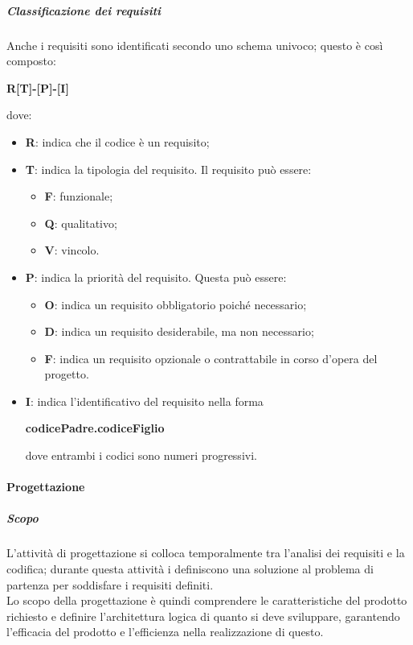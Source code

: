 \documentclass[../norme-di-progetto.tex]{subfiles}
\begin{document}
\subparagraph{Classificazione dei requisiti}
Anche i requisiti sono identificati secondo uno schema univoco; questo è così composto: \\
\begin{center}
  \centering
  \textbf{R[T]-[P]-[I]}
\end{center} dove:
\begin{itemize}
  \item \textbf{R}: indica che il codice è un requisito;
  \item \textbf{T}: indica la tipologia del requisito. Il requisito può essere:
  \begin{itemize}
    \item \textbf{F}: funzionale;
    \item \textbf{Q}: qualitativo;
    \item \textbf{V}: vincolo.
  \end{itemize}
  \item \textbf{P}: indica la priorità del requisito. Questa può essere:
  \begin{itemize}
    \item \textbf{O}: indica un requisito obbligatorio poiché necessario;
    \item \textbf{D}: indica un requisito desiderabile, ma non necessario;
    \item \textbf{F}: indica un requisito opzionale o contrattabile in corso d'opera del progetto.
  \end{itemize}
  \item \textbf{I}: indica l'identificativo del requisito nella forma \\
  \begin{center}
    \centering
    \textbf{codicePadre.codiceFiglio}
  \end{center} dove entrambi i codici sono numeri progressivi.
\end{itemize}


\paragraph{Progettazione}
\subparagraph{Scopo}
L'attività di progettazione si colloca temporalmente tra l'analisi dei requisiti e la codifica; durante questa attività i  definiscono una soluzione al problema di partenza per soddisfare i requisiti definiti. \\
Lo scopo della progettazione è quindi comprendere le caratteristiche del prodotto richiesto e definire l'architettura logica di quanto si deve sviluppare, garantendo l'efficacia del prodotto e l'efficienza nella realizzazione di questo.
\end{document}
